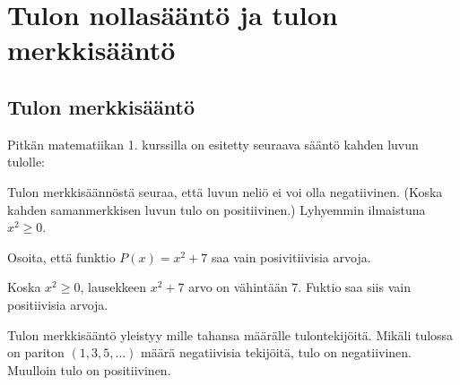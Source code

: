 \section{Tulon nollasääntö ja tulon merkkisääntö}

\subsection*{Tulon merkkisääntö}

Pitkän matematiikan 1. kurssilla on esitetty seuraava sääntö kahden luvun tulolle:


Tulon merkkisäännöstä seuraa, että luvun neliö ei voi olla negatiivinen. (Koska kahden samanmerkkisen luvun tulo on positiivinen.) Lyhyemmin ilmaistuna $x^2 \geq 0$.

\begin{esimerkki}
Osoita, että funktio $P(x)=x^2+7$ saa vain posivitiivisia arvoja.
    \begin{esimratk}
	Koska $x^2 \geq 0$, lausekkeen $x^2+7$ arvo on vähintään $7$. Fuktio saa siis
	vain positiivisia arvoja.
    \end{esimratk}
\end{esimerkki}


Tulon merkkisääntö yleistyy mille tahansa määrälle tulontekijöitä.
Mikäli tulossa on pariton $(1, 3, 5, \ldots)$ määrä negatiivisia tekijöitä, tulo on negatiivinen.
Muulloin tulo on positiivinen.


